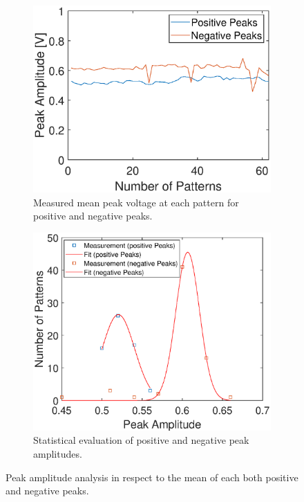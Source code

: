 \begin{figure}
	\begin{subfigure}[l]{0.49\textwidth} 
		\centering
		\includegraphics[clip,trim={0mm 0mm 0mm 0mm}, width=1.1\linewidth]{Ressourcen/Results/Measurement/Height_abs}
		\caption{Measured mean peak voltage at each pattern for positive and negative peaks.}
		\label{fig:exp:pattern:height:abs}
	\end{subfigure}
	\hfill
	\begin{subfigure}[r]{0.49\textwidth} 
		\centering
		\includegraphics[clip,trim={0mm 0mm 0mm 0mm}, width=1.05\linewidth]{Ressourcen/Results/Measurement/Height_hist}
		\caption{Statistical evaluation of positive and negative peak amplitudes.}
		\label{fig:exp:pattern:height:hist}
	\end{subfigure}
	\caption{Peak amplitude analysis in respect to the mean of each both positive and negative peaks.}
	\label{fig:exp:pattern:height}
\end{figure}

